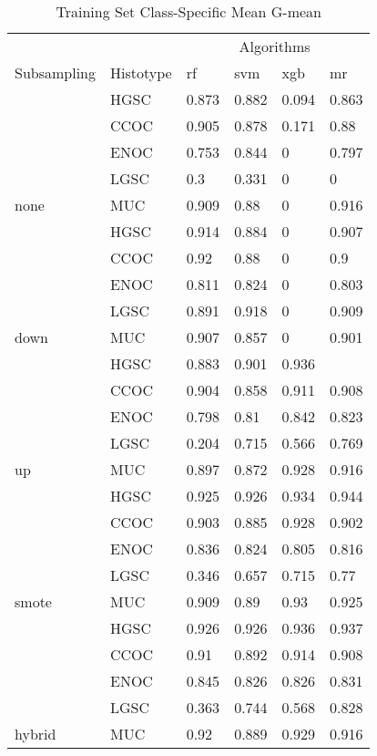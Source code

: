 \documentclass[
]{report}
\begin{document}
\begin{table}

\caption{\label{tab:train-gmean-class-table}Training Set Class-Specific Mean G-mean}
\centering
\begin{tabular}[t]{l|l|l|l|l|l}
\hline
\multicolumn{2}{c|}{ } & \multicolumn{4}{c}{Algorithms} \\
\cline{3-6}
Subsampling & Histotype & rf & svm & xgb & mr\\
\hline
 & HGSC & 0.873 & 0.882 & 0.094 & 0.863\\
\cline{2-6}
 & CCOC & 0.905 & 0.878 & 0.171 & 0.88\\
\cline{2-6}
 & ENOC & 0.753 & 0.844 & 0 & 0.797\\
\cline{2-6}
 & LGSC & 0.3 & 0.331 & 0 & 0\\
\cline{2-6}
\multirow{-5}{*}{\raggedright\arraybackslash none} & MUC & 0.909 & 0.88 & 0 & 0.916\\
\cline{1-6}
 & HGSC & 0.914 & 0.884 & 0 & 0.907\\
\cline{2-6}
 & CCOC & 0.92 & 0.88 & 0 & 0.9\\
\cline{2-6}
 & ENOC & 0.811 & 0.824 & 0 & 0.803\\
\cline{2-6}
 & LGSC & 0.891 & 0.918 & 0 & 0.909\\
\cline{2-6}
\multirow{-5}{*}{\raggedright\arraybackslash down} & MUC & 0.907 & 0.857 & 0 & 0.901\\
\cline{1-6}
 & HGSC & 0.883 & 0.901 & 0.936 & \cellcolor[HTML]{90ee90}{0.946}\\
\cline{2-6}
 & CCOC & 0.904 & 0.858 & 0.911 & 0.908\\
\cline{2-6}
 & ENOC & 0.798 & 0.81 & 0.842 & 0.823\\
\cline{2-6}
 & LGSC & 0.204 & 0.715 & 0.566 & 0.769\\
\cline{2-6}
\multirow{-5}{*}{\raggedright\arraybackslash up} & MUC & 0.897 & 0.872 & 0.928 & 0.916\\
\cline{1-6}
 & HGSC & 0.925 & 0.926 & 0.934 & 0.944\\
\cline{2-6}
 & CCOC & 0.903 & 0.885 & 0.928 & 0.902\\
\cline{2-6}
 & ENOC & 0.836 & 0.824 & 0.805 & 0.816\\
\cline{2-6}
 & LGSC & 0.346 & 0.657 & 0.715 & 0.77\\
\cline{2-6}
\multirow{-5}{*}{\raggedright\arraybackslash smote} & MUC & 0.909 & 0.89 & 0.93 & 0.925\\
\cline{1-6}
 & HGSC & 0.926 & 0.926 & 0.936 & 0.937\\
\cline{2-6}
 & CCOC & 0.91 & 0.892 & 0.914 & 0.908\\
\cline{2-6}
 & ENOC & 0.845 & 0.826 & 0.826 & 0.831\\
\cline{2-6}
 & LGSC & 0.363 & 0.744 & 0.568 & 0.828\\
\cline{2-6}
\multirow{-5}{*}{\raggedright\arraybackslash hybrid} & MUC & 0.92 & 0.889 & 0.929 & 0.916\\
\hline
\end{tabular}
\end{table}
\end{document}
